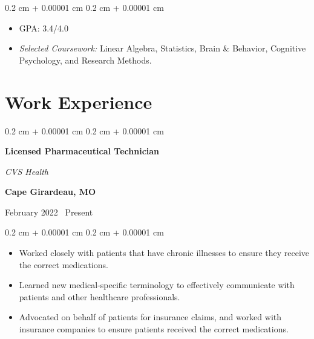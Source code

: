 \documentclass[10pt, letterpaper]{article}
\newenvironment{highlights}{
    \begin{itemize}[
        topsep=0.10 cm,
        parsep=0.10 cm,
        partopsep=0pt,
        itemsep=0pt,
        leftmargin=0.4 cm + 10pt
    ]
}{
    \end{itemize}
} %
\newenvironment{onecolentry}{
    \begin{adjustwidth}{
        0.2 cm + 0.00001 cm
    }{
        0.2 cm + 0.00001 cm
    }
}{
    \end{adjustwidth}
} %
\newenvironment{twocolentry}[2][]{
    \onecolentry
    \def\secondColumn{#2}
    \setcolumnwidth{\fill, 4.5 cm}
    \begin{paracol}{2}
}{
    \switchcolumn \raggedleft \secondColumn
    \end{paracol}
    \endonecolentry
} %
\begin{document}
\vspace{0.10 cm}

\begin{onecolentry}
    \begin{highlights}
        \item GPA: 3.4/4.0
        \item \textit{Selected Coursework:} Linear Algebra, Statistics, Brain \& Behavior, Cognitive Psychology, and Research Methods.
    \end{highlights}
\end{onecolentry}






\section{Work Experience}

\begin{samepage}

    \begin{twocolentry}{
            \textbf{Cape Girardeau, MO}

            February 2022 \textendash\ Present}
        \textbf{Licensed Pharmaceutical Technician}

        \textit{CVS Health}
    \end{twocolentry}

    \vspace{0.10 cm}
    \begin{onecolentry}
        \begin{highlights}
            \item Worked closely with patients that have chronic illnesses to ensure they receive the correct medications.
            \item Learned new medical-specific terminology to effectively communicate with patients and other healthcare professionals.
            \item Advocated on behalf of patients for insurance claims, and worked with insurance companies to ensure patients received the correct medications.
        \end{highlights}
    \end{onecolentry}
\end{samepage}
\end{document}
